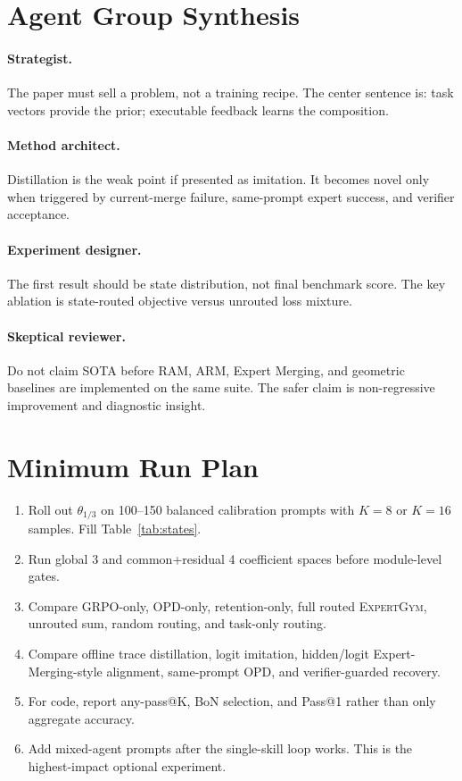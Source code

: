 \documentclass[11pt]{article}
\newcommand{\method}{\textsc{ExpertGym}\xspace}
\newcommand{\eqmerge}{\theta_{1/3}}
\begin{document}


\appendix

\section{Agent Group Synthesis}

\paragraph{Strategist.}  The paper must sell a problem, not a training recipe.  The center sentence is: task vectors provide the prior; executable feedback learns the composition.

\paragraph{Method architect.}  Distillation is the weak point if presented as imitation.  It becomes novel only when triggered by current-merge failure, same-prompt expert success, and verifier acceptance.

\paragraph{Experiment designer.}  The first result should be state distribution, not final benchmark score.  The key ablation is state-routed objective versus unrouted loss mixture.

\paragraph{Skeptical reviewer.}  Do not claim SOTA before RAM, ARM, Expert Merging, and geometric baselines are implemented on the same suite.  The safer claim is non-regressive improvement and diagnostic insight.

\section{Minimum Run Plan}

\begin{enumerate}[leftmargin=*]
    \item Roll out $\eqmerge$ on 100--150 balanced calibration prompts with $K=8$ or $K=16$ samples.  Fill Table~\ref{tab:states}.
    \item Run global 3 and common+residual 4 coefficient spaces before module-level gates.
    \item Compare GRPO-only, OPD-only, retention-only, full routed \method, unrouted sum, random routing, and task-only routing.
    \item Compare offline trace distillation, logit imitation, hidden/logit Expert-Merging-style alignment, same-prompt OPD, and verifier-guarded recovery.
    \item For code, report any-pass@K, BoN selection, and Pass@1 rather than only aggregate accuracy.
    \item Add mixed-agent prompts after the single-skill loop works.  This is the highest-impact optional experiment.
\end{enumerate}
\end{document}
